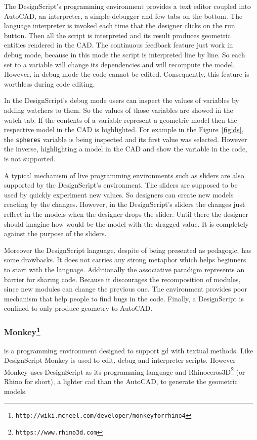 The DesignScript's programming environment provides a text editor coupled into AutoCAD, an interpreter, a simple debugger and few tabs on the bottom. The language interpreter is invoked each time that the designer clicks on the run button. Then all the script is interpreted and its result produces geometric entities rendered in the CAD. The continuous feedback feature just work in debug mode, because in this mode the script is interpreted line by line. So each set to a variable will change its dependencies and will recompute the model. However, in debug mode the code cannot be edited. Consequently, this feature is worthless during code editing.

In the DesignScript's debug mode users can inspect the values of variables by adding watchers to them. So the values of those variables are showed in the watch tab. If the contents of a variable represent a geometric model then the respective model in the CAD is highlighted. For example in the Figure~\ref{fig:ds}, the \texttt{spheres} variable is being inspected and its first value was selected. However the inverse, highlighting a model in the CAD and show the variable in the code, is not supported.

A typical mechanism of live programming environments such as sliders are also supported by the DesignScript's environment. The sliders are supposed to be used by quickly experiment new values. So designers can create new models reacting by the changes. However, in the DesignScript's sliders the changes just reflect in the models when the designer drops the slider. Until there the designer should imagine how would be the model with the dragged value. It is completely against the purpose of the sliders.

Moreover the DesignScript language, despite of being presented as pedagogic, has some drawbacks. It does not carries any strong metaphor which helps beginners to start with the language. Additionally the associative paradigm represents an barrier for sharing code. Because it discourages the recomposition of modules, since new modules can change the previous one. The environment provides poor mechanism that help people to find bugs in the code. Finally, a DesignScript is confined to only produce geometry to AutoCAD.
\subsubsection{Monkey\protect\footnote{\texttt{http://wiki.mcneel.com/developer/monkeyforrhino4}}} is a programming environment designed to support \ac{gd} with textual methods. Like DesignScript Monkey is used to edit, debug and interpreter scripts. However Monkey uses DesignScript as its programming language and Rhinoceros3D\footnote{\label{rhin}\texttt{https://www.rhino3d.com}} (or Rhino for short), a lighter \ac{cad} than the AutoCAD, to generate the geometric models.

